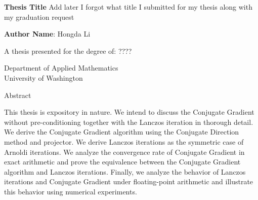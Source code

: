 \documentclass[]{article}
\theoremstyle{definition}
\begin{document}



\begin{center}
    \vspace*{1cm}
    \textbf{Thesis Title}
        Add later I forgot what title I submitted for my thesis along with my graduation request
    \vspace{1.5cm}

    \textbf{Author Name}: Hongda Li

    \vfill
         
    A thesis presented for the degree of: ???? 
         
    \vspace{0.8cm}
         
    Department of Applied Mathematics\\

    University of Washington\\

    

\end{center}

    \begin{center}
        Abstract
    \end{center}

    This thesis is expository in nature. We intend to discuss the Conjugate Gradient without pre-conditioning together with the Lanczos iteration in thorough detail. We derive the Conjugate Gradient algorithm using the Conjugate Direction method and projector. We derive Lanczos iterations as the symmetric case of Arnoldi iterations. We analyze the convergence rate of Conjugate Gradient in exact arithmetic and prove the equivalence between the Conjugate Gradient algorithm and Lanczos iterations. Finally, we analyze the behavior of Lanczos iterations and Conjugate Gradient under floating-point arithmetic and illustrate this behavior using numerical experiments.
         

\newpage
\tableofcontents

\newpage 
\end{document}
